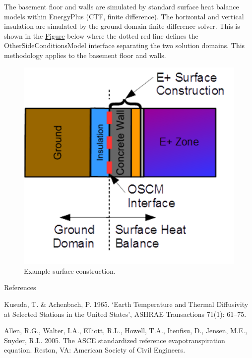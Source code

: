 The basement floor and walls are simulated by standard surface heat balance models within EnergyPlus (CTF, finite difference). The horizontal and vertical insulation are simulated by the ground domain finite difference solver. This is shown in the \protect\hyperlink{BasementGHTFigure1}{Figure} below where the dotted red line defines the OtherSideConditionsModel interface separating the two solution domains. This methodology applies to the basement floor and walls.

\begin{figure}[htbp]
\centering
\includegraphics{media/image8000.png}
\caption{Example surface construction.}
\end{figure}

References

Kusuda, T. \& Achenbach, P. 1965. `Earth Temperature and Thermal Diffusivity at Selected Stations in the United States', ASHRAE Transactions 71(1): 61--75.

Allen, R.G., Walter, I.A., Elliott, R.L., Howell, T.A., Itenfisu, D., Jensen, M.E., Snyder, R.L. 2005. The ASCE standardized reference evapotranspiration equation. Reston, VA: American Society of Civil Engineers.
